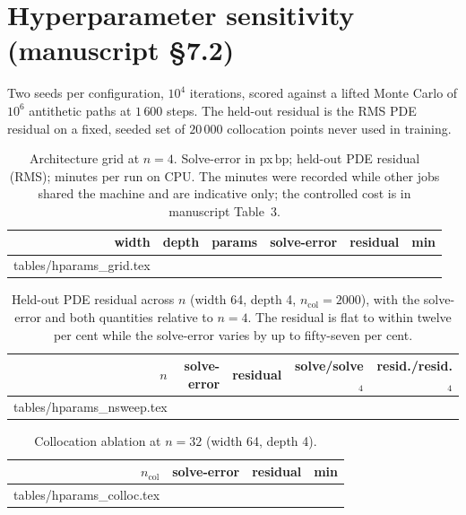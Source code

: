 \documentclass[11pt,a4paper]{article}
\makeatletter
\newcommand{\bp}{\ensuremath{\,\mathrm{bp}}}
\newcommand{\revrows}[1]{\@@input tables/#1.tex }
\makeatother
\begin{document}
\section{Hyperparameter sensitivity (manuscript \S7.2)}
Two seeds per configuration, $10^4$ iterations, scored against a lifted Monte
Carlo of $10^6$ antithetic paths at $1\,600$ steps. The held-out residual is the
RMS PDE residual on a fixed, seeded set of $20\,000$ collocation points never used
in training.

\begin{table}[h]
\centering
\caption{Architecture grid at $n{=}4$. Solve-error in px\bp{}; held-out PDE
residual (RMS); minutes per run on CPU. The minutes were recorded while other
jobs shared the machine and are indicative only; the controlled cost is in
manuscript Table~3.}
\label{tab:S-hpgrid}
\small
\begin{tabular}{@{}r r r r r r@{}}
\toprule
width & depth & params & solve-error & residual & min \\
\midrule
\revrows{hparams_grid}
\bottomrule
\end{tabular}
\end{table}

\begin{table}[h]
\centering
\caption{Held-out PDE residual across $n$ (width 64, depth 4,
$n_{\mathrm{col}}{=}2000$), with the solve-error and both quantities relative to
$n{=}4$. The residual is flat to within twelve per cent while the solve-error
varies by up to fifty-seven per cent.}
\label{tab:S-hpnsweep}
\small
\begin{tabular}{@{}r r r r r@{}}
\toprule
$n$ & solve-error & residual & solve/solve$_4$ & resid./resid.$_4$ \\
\midrule
\revrows{hparams_nsweep}
\bottomrule
\end{tabular}
\end{table}

\begin{table}[h]
\centering
\caption{Collocation ablation at $n{=}32$ (width 64, depth 4).}
\label{tab:S-hpcolloc}
\small
\begin{tabular}{@{}r r r r@{}}
\toprule
$n_{\mathrm{col}}$ & solve-error & residual & min \\
\midrule
\revrows{hparams_colloc}
\bottomrule
\end{tabular}
\end{table}

\end{document}

